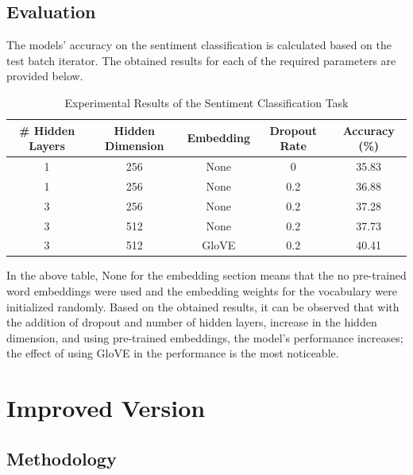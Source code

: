 \documentclass[12pt,a4paper]{article}
\begin{document}
	\vspace{-0.2cm}
	\subsection{Evaluation}
	The models' accuracy on the sentiment classification is calculated based on the test batch iterator. The obtained results for each of the required parameters are provided below.
	
	\begin{table}[H]
		\begin{center}
			\begin{tabular}{|c|c|c|c|c|}
				\hline
				 \# Hidden Layers & Hidden Dimension	& Embedding & Dropout Rate&Accuracy (\%)  \\ \hline
				1 &256 & None &0 &         35.83             \\ \hline
				1 &256 &None &0.2 &       36.88               \\ \hline
				3 &256 &None &0.2 &       37.28               \\ \hline
				3 &512 &None &0.2 &       37.73               \\ \hline
				3 &512 &GloVE &0.2 &      40.41                \\
				\hline             
			\end{tabular}
		\end{center}
	\vspace{-0.5cm}
	\caption{Experimental Results of the Sentiment Classification Task}
	\end{table}

\vspace{-0.3cm}
	\noindent In the above table, None for the embedding section means that the no pre-trained word embeddings were used and the embedding weights for the vocabulary were initialized randomly. Based on the obtained results, it can be observed that with the addition of dropout and number of hidden layers, increase in the hidden dimension, and using pre-trained embeddings, the model's performance increases; the effect of using GloVE in the performance is the most noticeable. 
	
	\section{Improved Version}


	\subsection{Methodology}
	
\end{document}
